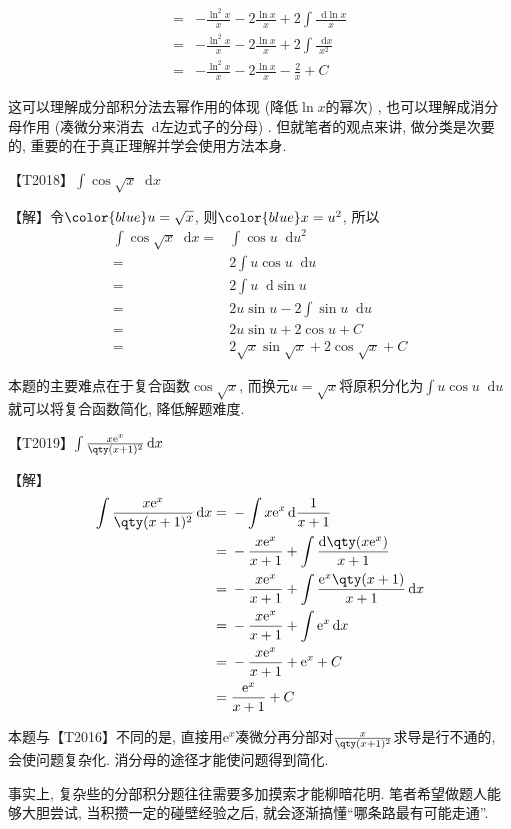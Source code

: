 \documentclass{ctexbook}
\newcommand{\e}{\mathrm{e}}
\newcommand*{\dif}{\mathop{}\!\mathrm{d}}
\begin{document}
{\begin{align*}
={}&-\frac{\ln^{2}{x}}{x}-2\frac{\ln{x}}{x}+2\int\frac{\dif{\ln{x}}}{x}\\
={}&-\frac{\ln^{2}{x}}{x}-2\frac{\ln{x}}{x}+2\int\frac{\dif{x}}{x^{2}}\\
={}&-\frac{\ln^{2}{x}}{x}-2\frac{\ln{x}}{x}-\frac{2}{x}+C
\end{align*}\par
{\kaishu 这可以理解成分部积分法去幂作用的体现 (降低$\ln{x}$的幂次) , 也可以理解成消分母作用 (凑微分来消去$\dif$左边式子的分母) . 但就笔者的观点来讲, 做分类是次要的, 重要的在于真正理解并学会使用方法本身. \par}
{\color{red}【T2018】}$\int\cos{\sqrt{x}}\dif{x}$\par
【解】令$\color{blue}u=\sqrt{x}$, 则$\color{blue}x=u^{2}$, 所以
\begin{align*}
\int\cos{\sqrt{x}}\dif{x}={}&\int\cos{u}\dif{u^{2}}\\
={}&2\int u\cos{u}\dif{u}\\
={}&2\int u\dif{\sin{u}}\\
={}&2u\sin{u}-2\int\sin{u}\dif{u}\\
={}&2u\sin{u}+2\cos{u}+C\\
={}&2\sqrt{x}\sin{\sqrt{x}}+2\cos{\sqrt{x}}+C
\end{align*}\par
{\kaishu 本题的主要难点在于复合函数$\cos{\sqrt{x}}$, 而换元$u=\sqrt{x}$将原积分化为$\int u\cos{u}\dif{u}$就可以将复合函数简化, 降低解题难度. \par}
{\color{red}【T2019】}$\int\frac{x\e^{x}}{\qty(x+1)^{2}}\dif{x}$\par
【解】
\begin{align*}
\int\frac{x\e^{x}}{\qty(x+1)^{2}}\dif{x}={}&-\int x\e^{x}\dif{\frac{1}{x+1}}\\
={}&-\frac{x\e^{x}}{x+1}+\int\frac{\dif{\qty(x\e^{x})}}{x+1}\\
={}&-\frac{x\e^{x}}{x+1}+\int\frac{\e^{x}\qty(x+1)}{x+1}\dif{x}\\
={}&-\frac{x\e^{x}}{x+1}+\int\e^{x}\dif{x}\\
={}&-\frac{x\e^{x}}{x+1}+\e^{x}+C\\
={}&\frac{\e^{x}}{x+1}+C
\end{align*}\par
{\kaishu 本题与{\color{red}【T2016】}不同的是, 直接用$\e^{x}$凑微分再分部对$\frac{x}{\qty(x+1)^{2}}$求导是行不通的, 会使问题复杂化. 消分母的途径才能使问题得到简化. \par
事实上, 复杂些的分部积分题往往需要多加摸索才能柳暗花明. 笔者希望做题人能够大胆尝试, 当积攒一定的碰壁经验之后, 就会逐渐搞懂“哪条路最有可能走通”. \par}
}
\end{document}

